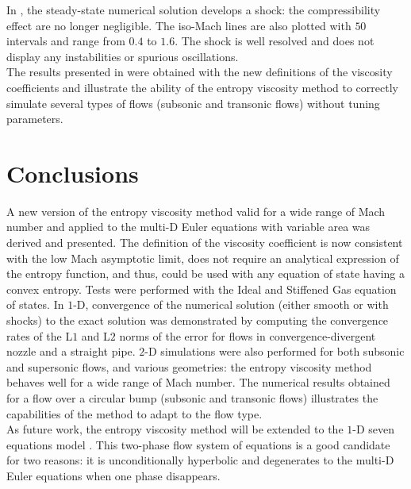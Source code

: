 In , the steady-state numerical solution develops a shock: the compressibility effect are no longer negligible. The iso-Mach lines are also plotted with $50$ intervals and range from $0.4$ to $1.6$. The shock is well resolved and does not display any instabilities or spurious oscillations. \\
The results presented in  were obtained with the new definitions of the viscosity coefficients and illustrate the ability of the entropy viscosity method to correctly simulate several types of flows (subsonic and transonic flows) without tuning parameters.%
\section{Conclusions} \label{sec:ccl}
A new version of the entropy viscosity method valid for a wide range of Mach number and applied to the multi-D Euler equations with variable area was derived and presented. The definition of the viscosity coefficient is now consistent with the low Mach asymptotic limit, does not require an analytical expression of the entropy function, and thus, could be used with any equation of state having a convex entropy. Tests were performed with the Ideal and Stiffened Gas equation of states. In $1$-D, convergence of the numerical solution (either smooth or with shocks) to the exact solution was demonstrated by computing the convergence rates of the L$1$ and L$2$ norms of the error for flows in convergence-divergent nozzle and a straight pipe. $2$-D simulations were also performed for both subsonic and supersonic flows, and various geometries: the entropy viscosity method behaves well for a wide range of Mach number. The numerical results obtained for a flow over a circular bump (subsonic and transonic flows) illustrates the capabilities of the method to adapt to the flow type. \\
As future work, the entropy viscosity method will be extended to the $1$-D seven equations model \cite{SEM}. This two-phase flow system of equations is a good candidate for two reasons: it is unconditionally hyperbolic and degenerates to the multi-D Euler equations when one phase disappears.